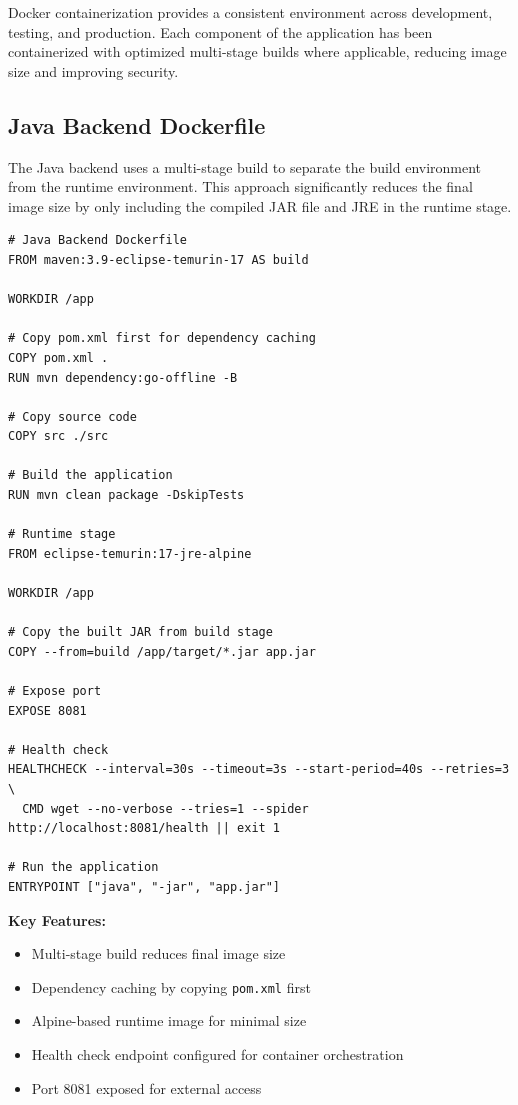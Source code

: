 \documentclass[12pt,a4paper]{article}
\begin{document}
Docker containerization provides a consistent environment across development, testing, and production. Each component of the application has been containerized with optimized multi-stage builds where applicable, reducing image size and improving security.

\subsection{Java Backend Dockerfile}

The Java backend uses a multi-stage build to separate the build environment from the runtime environment. This approach significantly reduces the final image size by only including the compiled JAR file and JRE in the runtime stage.

\begin{lstlisting}[style=dockerfile, caption={Java Backend Dockerfile}, label={lst:java-dockerfile}]
# Java Backend Dockerfile
FROM maven:3.9-eclipse-temurin-17 AS build

WORKDIR /app

# Copy pom.xml first for dependency caching
COPY pom.xml .
RUN mvn dependency:go-offline -B

# Copy source code
COPY src ./src

# Build the application
RUN mvn clean package -DskipTests

# Runtime stage
FROM eclipse-temurin:17-jre-alpine

WORKDIR /app

# Copy the built JAR from build stage
COPY --from=build /app/target/*.jar app.jar

# Expose port
EXPOSE 8081

# Health check
HEALTHCHECK --interval=30s --timeout=3s --start-period=40s --retries=3 \
  CMD wget --no-verbose --tries=1 --spider http://localhost:8081/health || exit 1

# Run the application
ENTRYPOINT ["java", "-jar", "app.jar"]
\end{lstlisting}

\textbf{Key Features:}
\begin{itemize}
    \item Multi-stage build reduces final image size
    \item Dependency caching by copying \texttt{pom.xml} first
    \item Alpine-based runtime image for minimal size
    \item Health check endpoint configured for container orchestration
    \item Port 8081 exposed for external access
\end{itemize}
\end{document}
